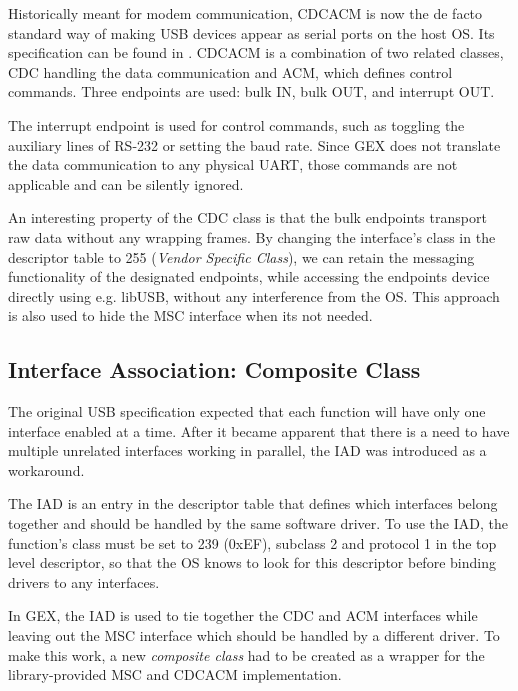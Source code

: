 
Historically meant for modem communication, \gls{CDCACM} is now the de facto standard way of making \gls{USB} devices appear as serial ports on the host \gls{OS}. Its specification can be found in \cite{usbif-cdc}. \gls{CDCACM} is a combination of two related classes, \gls{CDC} handling the data communication and \gls{ACM}, which defines control commands. Three endpoints are used: bulk IN, bulk OUT, and interrupt OUT.

The interrupt endpoint is used for control commands, such as toggling the auxiliary lines of RS-232 or setting the baud rate. Since GEX does not translate the data communication to any physical UART, those commands are not applicable and can be silently ignored.

An interesting property of the \gls{CDC} class is that the bulk endpoints transport raw data without any wrapping frames. By changing the interface's class in the descriptor table to 255 (\textit{Vendor Specific Class}), we can retain the messaging functionality of the designated endpoints, while accessing the endpoints device directly using e.g. libUSB, without any interference from the \gls{OS}. This approach is also used to hide the \gls{MSC} interface when its not needed.

\subsection{Interface Association: Composite Class}

The original \gls{USB} specification expected that each function will have only one interface enabled at a time. After it became apparent that there is a need to have multiple unrelated interfaces working in parallel, the \gls{IAD} \cite{usbif-iad} was introduced as a workaround.

The \gls{IAD} is an entry in the descriptor table that defines which interfaces belong together and should be handled by the same software driver. To use the \gls{IAD}, the function's class must be set to 239 (0xEF), subclass 2 and protocol 1 in the top level descriptor, so that the \gls{OS} knows to look for this descriptor before binding drivers to any interfaces.

In GEX, the \gls{IAD} is used to tie together the \gls{CDC} and \gls{ACM} interfaces while leaving out the \gls{MSC} interface which should be handled by a different driver. To make this work, a new \textit{composite class} had to be created as a wrapper for the library-provided \gls{MSC} and \gls{CDCACM} implementation.

